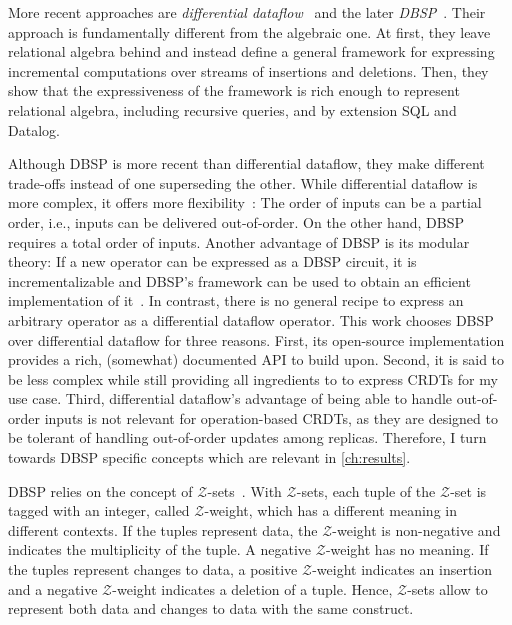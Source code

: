More recent approaches are \emph{differential dataflow}~\cite{mcsherry2013differential}
and the later \emph{DBSP}~\cite{budiu2022dbsp, budiu2024dbsp, budiu2025dbsp}.
Their approach is fundamentally different from the algebraic one.
At first, they leave relational algebra behind and instead define a general
framework for expressing incremental computations over streams of insertions
and deletions.
Then, they show that the expressiveness of the framework is rich enough to
represent relational algebra, including recursive queries, and by extension
SQL and Datalog.

Although DBSP is more recent than differential dataflow,
they make different trade-offs instead of one superseding the other.
While differential dataflow is more complex, it offers more
flexibility~\cite{budiu2025dbsp}:
The order of inputs can be a partial order, i.e., inputs can be delivered
out-of-order.
On the other hand, DBSP requires a total order of inputs.
Another advantage of DBSP is its modular theory:
If a new operator can be expressed as a DBSP circuit, it is incrementalizable
and DBSP's framework can be used to obtain an efficient implementation
of it~\cite{budiu2025dbsp}.
In contrast, there is no general recipe to express an arbitrary operator
as a differential dataflow operator.
This work chooses DBSP over differential dataflow for three reasons.
First, its open-source implementation~\cite{feldera} provides a rich,
(somewhat) documented API\footnotemark{} to build upon.
Second, it is said to be less complex while still providing all ingredients to
to express \acp{CRDT} for my use case.
Third, differential dataflow's advantage of being able to handle out-of-order
inputs is not relevant for operation-based \acp{CRDT}, as they are designed
to be tolerant of handling out-of-order updates among replicas.
Therefore, I turn towards DBSP specific concepts which are relevant in \ref{ch:results}.


\newcommand{\zset}{\(\mathcal{Z}\)-set}
\newcommand{\zsets}{\(\mathcal{Z}\)-sets}
\newcommand{\zweight}{\(\mathcal{Z}\)-weight}

DBSP relies on the concept of \zsets{}~\cite{green2007provenance}\footnotemark{}.
With \zsets{}, each tuple of the \zset{} is tagged with an integer,
called \zweight{}, which has a different meaning in different contexts.
If the tuples represent data, the \zweight{} is non-negative and indicates
the multiplicity of the tuple.
A negative \zweight{} has no meaning.
If the tuples represent changes to data, a positive \zweight{} indicates
an insertion and a negative \zweight{} indicates a deletion of a tuple.
Hence, \zsets{} allow to represent both data and changes to data with the
same construct.

